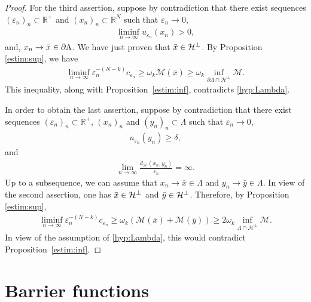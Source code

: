 \documentclass[a4paper]{amsart}
\begin{document}
\begin{proof}
\medbreak

For the third assertion, suppose by contradiction that there exist sequences $(\varepsilon_n)_n \subset {\mathbb{R}}^+$ and
$(x_n)_n \subset {\mathbb{R}}^{N}$ such that $\varepsilon_n \to 0$,
\begin{align*}
 \liminf_{n\to\infty} u_{\varepsilon_n}(x_n) > 0,
\end{align*}
and, $x_n \to \Bar{x} \in \partial \Lambda$. We have just proven that $\Bar{x} \in \mathcal{H}^\perp$.
By Proposition \ref{estim:sup}, we have
 \begin{align*}
 \liminf_{n\to\infty} \varepsilon_n^{-(N-k)} c_{\varepsilon_n} \geq \omega_k \mathcal{M}(\bar{x}) \geq \omega_k
\inf_{\partial \Lambda \cap \mathcal{H}^\perp} \mathcal{M}.
 \end{align*}
This inequality, along with Proposition~\ref{estim:inf}, contradicts \eqref{hyp:Lambda}.

\medbreak
In order to obtain the last assertion, suppose by contradiction that there exist sequences $(\varepsilon_n)_n \subset
{\mathbb{R}}^+$, $(x_n)_{n}$  and $(y_n)_n
\subset \Lambda$ such that $\varepsilon_n \to 0$,
\begin{align*}
 u_{\varepsilon_n}(y_n) \geq \delta,
\end{align*}
and
\begin{align*}
 \lim_{n \to \infty} \frac{d_{\mathcal{H}}(x_{n},y_n)}{\varepsilon_n} = \infty. 
\end{align*}
Up to a subsequence, we can assume that $x_{n}\to \bar{x} \in \Lambda$ and $y_n\to
\bar{y} \in \Lambda$. In view of the second assertion, one has $\Bar{x} \in \mathcal{H}^\perp$ and $\Bar{y} \in
\mathcal{H}^\perp$. Therefore, by Proposition \ref{estim:sup},
\begin{align*}
 \liminf_{n\to\infty} \varepsilon_n^{-(N-k)} c_{\varepsilon_n} \geq \omega_k \left( \mathcal{M}(\bar{x}) +
\mathcal{M}(\bar{y}) \right) \geq 2\omega_k \inf_{\Lambda \cap \mathcal{H}^\perp} \mathcal{M}.
 \end{align*}
In view of the assumption of \eqref{hyp:Lambda}, this would contradict Proposition~\ref{estim:inf}.
\end{proof}
\section{Barrier functions}\label{sec:barrier}
\end{document}
